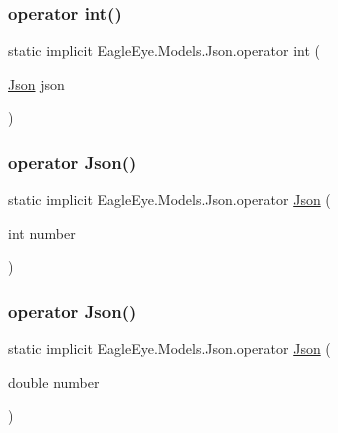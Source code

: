 \mbox{\label{class_eagle_eye_1_1_models_1_1_json_a2af5ba2026820d0c8fdc671ee0b46a4d}} 
\subsubsection{\texorpdfstring{operator int()}{operator int()}}
{\footnotesize\ttfamily static implicit Eagle\+Eye.\+Models.\+Json.\+operator int (\begin{DoxyParamCaption}\item[{\mbox{\hyperlink{class_eagle_eye_1_1_models_1_1_json}{Json}}}]{json }\end{DoxyParamCaption})\hspace{0.3cm}{\ttfamily [static]}}

\mbox{\label{class_eagle_eye_1_1_models_1_1_json_a2116f2d9d1d806f4cdc6afee774b7945}} 
\subsubsection{\texorpdfstring{operator Json()}{operator Json()}\hspace{0.1cm}{\footnotesize\ttfamily [1/4]}}
{\footnotesize\ttfamily static implicit Eagle\+Eye.\+Models.\+Json.\+operator \mbox{\hyperlink{class_eagle_eye_1_1_models_1_1_json}{Json}} (\begin{DoxyParamCaption}\item[{int}]{number }\end{DoxyParamCaption})\hspace{0.3cm}{\ttfamily [static]}}

\mbox{\label{class_eagle_eye_1_1_models_1_1_json_a2a8bcde77f6eacf7e1b80e69cdbf71dd}} 
\subsubsection{\texorpdfstring{operator Json()}{operator Json()}\hspace{0.1cm}{\footnotesize\ttfamily [2/4]}}
{\footnotesize\ttfamily static implicit Eagle\+Eye.\+Models.\+Json.\+operator \mbox{\hyperlink{class_eagle_eye_1_1_models_1_1_json}{Json}} (\begin{DoxyParamCaption}\item[{double}]{number }\end{DoxyParamCaption})\hspace{0.3cm}{\ttfamily [static]}}


